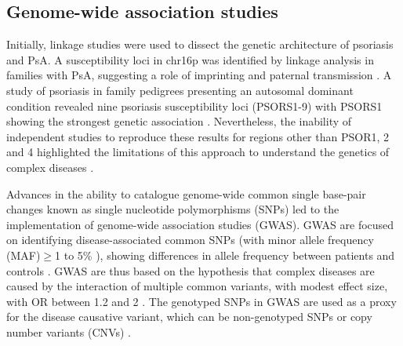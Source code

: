 \subsection{Genome-wide association studies}
\label{GWAS}

Initially, linkage studies were used to dissect the genetic architecture of psoriasis and PsA. A susceptibility loci in chr16p was identified by linkage analysis in families with PsA, suggesting a role of imprinting and paternal transmission \parencite{Karason2003}. A study of psoriasis in family pedigrees presenting an autosomal dominant condition revealed nine psoriasis susceptibility loci (PSORS1-9) with PSORS1 showing the strongest genetic association \parencite{Consortium2003}. Nevertheless, the inability of independent studies to reproduce these results for regions other than PSOR1, 2 and 4 highlighted the limitations of this approach to understand the genetics of complex diseases \parencite{Capon2017}.

Advances in the ability to catalogue genome-wide common single base-pair changes known as single nucleotide polymorphisms (SNPs) led to the implementation of genome-wide association studies (GWAS). GWAS are focused on identifying disease-associated common SNPs (with minor allele frequency (MAF)$\geq$1 to 5\% ), showing differences in allele frequency between patients and controls \parencite{Ku2010}. GWAS are thus based on the hypothesis that complex diseases are caused by the interaction of multiple common variants, with modest effect size, with OR between 1.2 and 2 \parencite{Schork2009, Cui2010}. The genotyped SNPs in GWAS are used as a proxy for the disease causative variant, which can be non-genotyped SNPs or copy number variants (CNVs) \parencite{Hirschhorn2005, Ku2010}.


